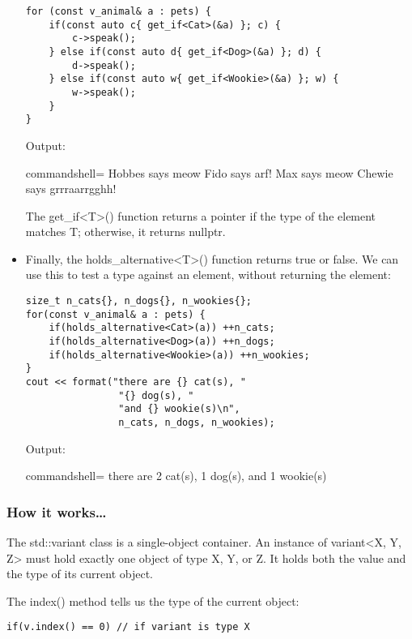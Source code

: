 \begin{itemize}
\begin{lstlisting}[style=styleCXX]
for (const v_animal& a : pets) {
	if(const auto c{ get_if<Cat>(&a) }; c) {
		c->speak();
	} else if(const auto d{ get_if<Dog>(&a) }; d) {
		d->speak();
	} else if(const auto w{ get_if<Wookie>(&a) }; w) {
		w->speak();
	}
}
\end{lstlisting}

Output:

\begin{tcblisting}{commandshell={}}
Hobbes says meow
Fido says arf!
Max says meow
Chewie says grrraarrgghh!
\end{tcblisting}

The get\_if<T>() function returns a pointer if the type of the element matches T; otherwise, it returns nullptr.

\item 
Finally, the holds\_alternative<T>() function returns true or false. We can use this to test a type against an element, without returning the element:

\begin{lstlisting}[style=styleCXX]
size_t n_cats{}, n_dogs{}, n_wookies{};
for(const v_animal& a : pets) {
	if(holds_alternative<Cat>(a)) ++n_cats;
	if(holds_alternative<Dog>(a)) ++n_dogs;
	if(holds_alternative<Wookie>(a)) ++n_wookies;
}
cout << format("there are {} cat(s), "
				"{} dog(s), "
				"and {} wookie(s)\n",
				n_cats, n_dogs, n_wookies);
\end{lstlisting}

Output:

\begin{tcblisting}{commandshell={}}
there are 2 cat(s), 1 dog(s), and 1 wookie(s)
\end{tcblisting}
\end{itemize}

\subsubsection{How it works…}

The std::variant class is a single-object container. An instance of variant<X, Y, Z> must hold exactly one object of type X, Y, or Z. It holds both the value and the type of its current object.

The index() method tells us the type of the current object:

\begin{lstlisting}[style=styleCXX]
if(v.index() == 0) // if variant is type X
\end{lstlisting}

